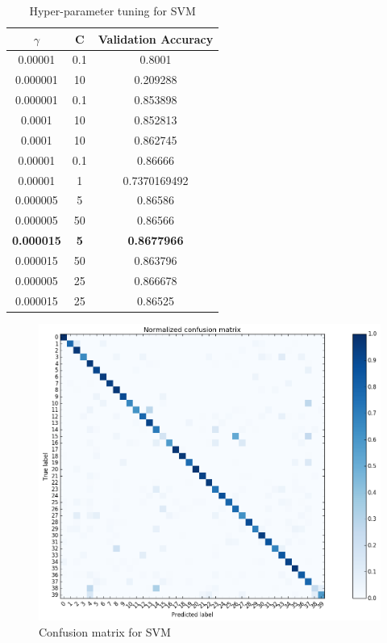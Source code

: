 \documentclass[10pt,twocolumn,letterpaper]{article}
\begin{document}
\begin{table}
\begin{center}
\label{SVM_tuning}
\begin{tabular}{|c|c|c|}
\hline
$\gamma$             & C          & Validation Accuracy \\
\hline\hline
0.00001           & 0.1        & 0.8001              \\
0.000001          & 10         & 0.209288            \\
0.000001          & 0.1        & 0.853898            \\
0.0001            & 10         & 0.852813            \\
0.0001            & 10         & 0.862745            \\
0.00001           & 0.1        & 0.86666             \\
0.00001           & 1          & 0.7370169492        \\
0.000005          & 5          & 0.86586             \\
0.000005          & 50         & 0.86566             \\
\textbf{0.000015} & \textbf{5} & \textbf{0.8677966}  \\
0.000015          & 50         & 0.863796            \\
0.000005          & 25         & 0.866678            \\
0.000015          & 25         & 0.86525            \\
\hline
\end{tabular}
\end{center}
\caption{Hyper-parameter tuning for SVM}
\end{table}


\begin{figure}[t]
\begin{center}
\includegraphics[width=\linewidth]{confusion_matrix.png}
\end{center}
   \caption{Confusion matrix for SVM}
\label{confusion_matrix}
\end{figure}
\end{document}
